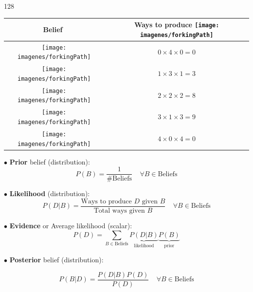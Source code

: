 \documentclass[shownotes]{beamer}
\begin{document}
\begin{frame}
{\begin{textblock}{128}
 \begin{table}[H]
\begin{tabular}{cc}
 \ \ \ Belief \ \ \ & Ways to produce \texttt{[image: imagenes/forkingPath]}   \\ \hline
  \texttt{[image: imagenes/forkingPath]} &  $0 \times 4 \times 0 = 0$ \\
 \texttt{[image: imagenes/forkingPath]} &  $1 \times 3 \times 1 = 3$ \\
 \texttt{[image: imagenes/forkingPath]} &  $2 \times 2 \times 2 = 8$ \\
 \texttt{[image: imagenes/forkingPath]} &  $3 \times 1 \times 3 = 9$ \\
 \texttt{[image: imagenes/forkingPath]} &  $4 \times 0 \times 4 = 0$ \\
\end{tabular}
\end{table}
\end{textblock}

}

\end{frame}

\begin{frame}
 
 \footnotesize
 
 $\bullet$ \textbf{Prior} belief (distribution):
 \begin{equation*}
P(B) = \frac{1}{\# \text{Beliefs} }  \ \ \ \ \  \forall B \in \text{Beliefs}  
 \end{equation*}

\pause \vspace{0.3cm}
 
 $\bullet$ \textbf{Likelihood} (distribution):
 \begin{equation*}
P(D|B) = \frac{\text{Ways to produce $D$ given $B$}}{\text{Total ways given $B$}} \ \ \ \ \  \forall B \in \text{Beliefs}  
 \end{equation*}

\pause \vspace{0.3cm}

$\bullet$ \textbf{Evidence} or Average likelihood (scalar):
\begin{equation*}
 P(D) = \sum_{B \in \text{Beliefs}} \underbrace{P(D|B)}_{\text{likelihood}} \underbrace{P(B)}_{\text{prior}}
\end{equation*}

\pause \vspace{0.3cm}

$\bullet$ \textbf{Posterior} belief (distribution):

\begin{equation*}
 P(B|D) = \frac{P(D|B)P(D)}{P(D)}\ \ \ \ \  \forall B \in \text{Beliefs}  
\end{equation*}

 
 
\end{frame}
\end{document}
